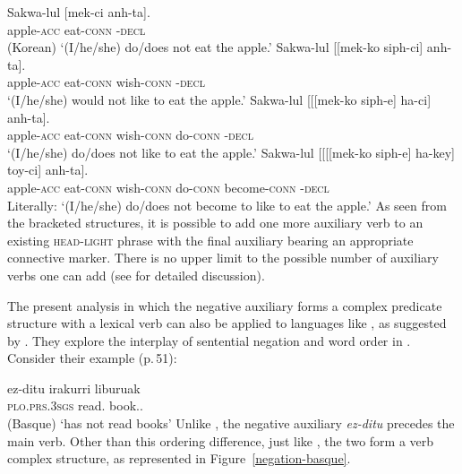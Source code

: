 \documentclass[output=paper,biblatex,babelshorthands,newtxmath,draftmode,colorlinks,citecolor=brown]{langscibook}
\begin{document}
\begin{exe}
\begin{xlist}
\begin{exe}
\begin{xlist}
\eal
\ex
\gll Sakwa-lul          [mek-ci anh-ta]. \\
     apple-\textsc{acc} \spacebr{}eat-\textsc{conn} \NEG-\textsc{decl} \\\hfill(Korean)
\glt `(I/he/she) do/does not eat the apple.'
\ex
\gll Sakwa-lul          [[mek-ko siph-ci] anh-ta]. \\
     apple-\textsc{acc} \hphantom{[[}eat-\textsc{conn} wish-\textsc{conn} \NEG-\textsc{decl} \\
\glt `(I/he/she) would not like to eat the apple.'
%
\ex \label{negation-20c}
\gll Sakwa-lul          [[[mek-ko siph-e] ha-ci] anh-ta]. \\
     apple-\textsc{acc} \hphantom{[[[}eat-\textsc{conn} wish-\textsc{conn} do-\textsc{conn} \NEG-\textsc{decl} \\
\glt `(I/he/she) do/does not like to eat the apple.'
%
\ex
\gll Sakwa-lul          [[[[mek-ko siph-e] ha-key] toy-ci] anh-ta]. \\
     apple-\textsc{acc} \hphantom{[[[[}eat-\textsc{conn} wish-\textsc{conn} do-\textsc{conn} become-\textsc{conn} \NEG-\textsc{decl} \\
\glt Literally: `(I/he/she) do/does not become to like to eat the apple.'
\zl
%
\largerpage[1]
As seen from the bracketed structures, it is possible to add one more auxiliary verb to
an existing \textsc{head-light} phrase with the final auxiliary bearing an appropriate
  connective marker. There is no upper limit to the possible number  of auxiliary
  verbs one can add (see \citealt[]{Kim:16} for detailed discussion).

The present analysis in which the  negative auxiliary forms a complex
predicate structure with a lexical verb can also be applied to languages
like , as suggested by \citet{CB:11}. They explore the interplay of sentential
negation and word order in . Consider their example (p.\,51):

\ea
\label{negation-basque-ex}
\gll ez-ditu irakurri liburuak \\
     \textsc{plo}.\textsc{prs}.\textsc{3sgs} read.\PRF{} book.\ABS.\pl\\\hfill(Basque)
\glt `has not read books'
\z
%
%
Unlike , the negative auxiliary \textit{ez-ditu} precedes
the main verb. Other than this ordering difference, just
like , the two form a verb complex structure, as represented in
Figure~\ref{negation-basque}.


\end{xlist}
\end{exe}
\end{xlist}
\end{exe}
\end{document}
